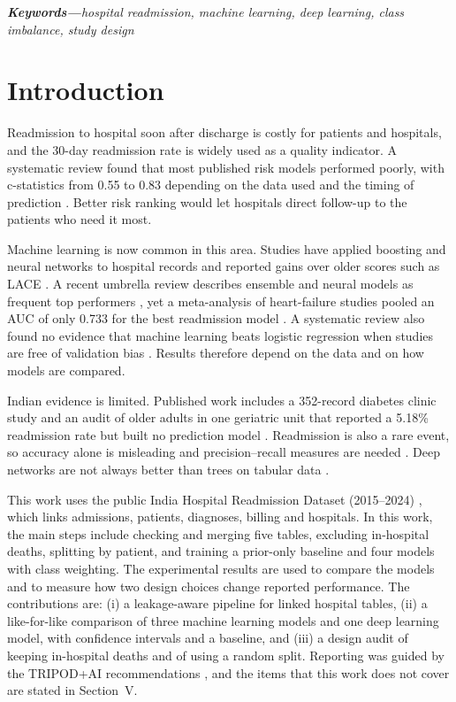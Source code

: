 \documentclass[conference,a4paper]{IEEEtran}
\begin{document}
\vspace{2pt}
\noindent\textbf{\textit{Keywords---}}\textit{hospital readmission, machine learning, deep learning, class imbalance, study design}

\section{Introduction}
Readmission to hospital soon after discharge is costly for patients and hospitals, and the 30-day readmission rate is widely used as a quality indicator. A systematic review found that most published risk models performed poorly, with c-statistics from 0.55 to 0.83 depending on the data used and the timing of prediction \cite{kansagara}. Better risk ranking would let hospitals direct follow-up to the patients who need it most.

Machine learning is now common in this area. Studies have applied boosting and neural networks to hospital records and reported gains over older scores such as LACE \cite{davis,silva}. A recent umbrella review describes ensemble and neural models as frequent top performers \cite{alrazeeni}, yet a meta-analysis of heart-failure studies pooled an AUC of only 0.733 for the best readmission model \cite{hajishah}. A systematic review also found no evidence that machine learning beats logistic regression when studies are free of validation bias \cite{christodoulou}. Results therefore depend on the data and on how models are compared.

Indian evidence is limited. Published work includes a 352-record diabetes clinic study \cite{mishra} and an audit of older adults in one geriatric unit that reported a 5.18\% readmission rate but built no prediction model \cite{samuel}. Readmission is also a rare event, so accuracy alone is misleading and precision--recall measures are needed \cite{saito2015pr}. Deep networks are not always better than trees on tabular data \cite{grinsztajn2022tree}.

This work uses the public India Hospital Readmission Dataset (2015--2024) \cite{kaggle}, which links admissions, patients, diagnoses, billing and hospitals. In this work, the main steps include checking and merging five tables, excluding in-hospital deaths, splitting by patient, and training a prior-only baseline and four models with class weighting. The experimental results are used to compare the models and to measure how two design choices change reported performance. The contributions are: (i) a leakage-aware pipeline for linked hospital tables, (ii) a like-for-like comparison of three machine learning models and one deep learning model, with confidence intervals and a baseline, and (iii) a design audit of keeping in-hospital deaths and of using a random split. Reporting was guided by the TRIPOD+AI recommendations \cite{collins2024}, and the items that this work does not cover are stated in Section~V.
\end{document}
